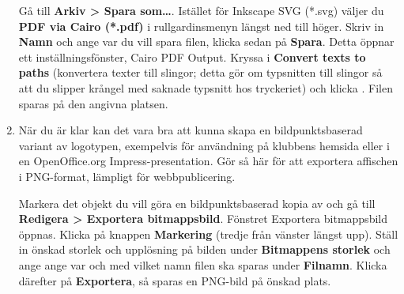 \documentclass[a4paper,final]{memoir} %
\begin{document}
\begin{enumerate}

Gå till \textbf{Arkiv \textgreater{} Spara som\ldots{}}. Istället för Inkscape SVG (*.svg) väljer du \textbf{PDF via Cairo (*.pdf)} i rullgardinsmenyn längst ned till höger. Skriv in \textbf{Namn} och ange var du vill spara filen, klicka sedan på \textbf{Spara}. Detta öppnar ett inställningsfönster, Cairo PDF Output. Kryssa i \textbf{Convert texts to paths} (konvertera texter till slingor; detta gör om typsnitten till slingor så att du slipper krångel med saknade typsnitt hos tryckeriet) och klicka \xok{}. Filen sparas på den angivna platsen.



\item När du är klar kan det vara bra att kunna skapa en bildpunktsbaserad variant av logotypen, exempelvis för användning på klubbens hemsida eller i en OpenOffice.org Impress-presentation. Gör så här för att exportera affischen i PNG-format, lämpligt för webbpublicering.

Markera det objekt du vill göra en bildpunktsbaserad kopia av och gå till \textbf{Redigera \textgreater{} Exportera bitmappsbild}. Fönstret Exportera bitmappsbild öppnas. Klicka på knappen \textbf{Markering} (tredje från vänster längst upp). Ställ in önskad storlek och upplösning på bilden under \textbf{Bitmappens storlek} och ange ange var och med vilket namn filen ska sparas under \textbf{Filnamn}. Klicka därefter på \textbf{Exportera}, så sparas en PNG-bild på önskad plats.

\end{enumerate}
\end{document}
